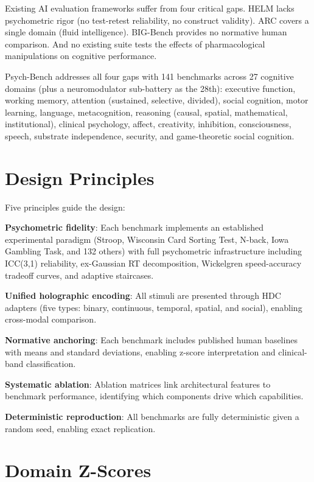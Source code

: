 \documentclass[12pt]{book}
\begin{document}
Existing AI evaluation frameworks suffer from four critical gaps. HELM lacks psychometric rigor (no test-retest reliability, no construct validity). ARC covers a single domain (fluid intelligence). BIG-Bench provides no normative human comparison. And no existing suite tests the effects of pharmacological manipulations on cognitive performance.

Psych-Bench addresses all four gaps with 141 benchmarks across 27 cognitive domains (plus a neuromodulator sub-battery as the 28th): executive function, working memory, attention (sustained, selective, divided), social cognition, motor learning, language, metacognition, reasoning (causal, spatial, mathematical, institutional), clinical psychology, affect, creativity, inhibition, consciousness, speech, substrate independence, security, and game-theoretic social cognition.

\section{Design Principles}

Five principles guide the design:

\textbf{Psychometric fidelity}: Each benchmark implements an established experimental paradigm (Stroop, Wisconsin Card Sorting Test, N-back, Iowa Gambling Task, and 132 others) with full psychometric infrastructure including ICC(3,1) reliability, ex-Gaussian RT decomposition, Wickelgren speed-accuracy tradeoff curves, and adaptive staircases.

\textbf{Unified holographic encoding}: All stimuli are presented through HDC adapters (five types: binary, continuous, temporal, spatial, and social), enabling cross-modal comparison.

\textbf{Normative anchoring}: Each benchmark includes published human baselines with means and standard deviations, enabling z-score interpretation and clinical-band classification.

\textbf{Systematic ablation}: Ablation matrices link architectural features to benchmark performance, identifying which components drive which capabilities.

\textbf{Deterministic reproduction}: All benchmarks are fully deterministic given a random seed, enabling exact replication.

\section{Domain Z-Scores}
\end{document}
